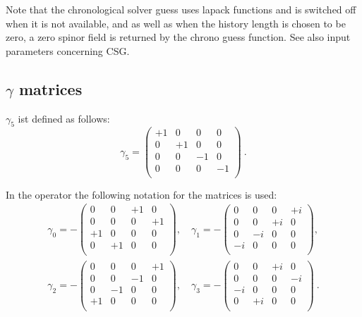 Note that the chronological solver guess uses lapack functions and is
switched off when it is not available, and as well as when the history
length is chosen to be zero, a zero spinor field is returned by the
chrono guess function. See also input parameters concerning CSG.

\subsection{$\gamma$ matrices}
\label{gammas}
$\gamma_5$ ist defined as follows:
\[
  \gamma_5 =
  \begin{pmatrix}
    +1 & 0 & 0 & 0 \\
    0 & +1 & 0 & 0 \\
    0 & 0 & -1 & 0 \\
    0 & 0 & 0 & -1 \\    
  \end{pmatrix}\ .
\]

In the operator the following notation for
the matrices is used:
\[
\begin{split}
  \gamma_0 = -\begin{pmatrix}
    0 & 0 & +1 & 0 \\
    0 & 0 & 0 & +1 \\
    +1 & 0 & 0 & 0 \\
    0 & +1 & 0 & 0 \\
  \end{pmatrix},\quad
  \gamma_1 = -\begin{pmatrix}
    0 & 0 & 0 & +i \\
    0 & 0 & +i & 0 \\
    0 & -i & 0 & 0 \\
    -i & 0 & 0 & 0 \\    
  \end{pmatrix},\\
  \gamma_2 = -\begin{pmatrix}
    0 & 0 & 0 & +1 \\
    0 & 0 & -1 & 0 \\
    0 & -1 & 0 & 0 \\
    +1 & 0 & 0 & 0 \\   
  \end{pmatrix},\quad
  \gamma_3 = -\begin{pmatrix}
    0 & 0 & +i & 0 \\
    0 & 0 & 0 & -i \\
    -i & 0 & 0 & 0 \\
    0 & +i & 0 & 0 \\
  \end{pmatrix}\ .\\
\end{split}
\]

